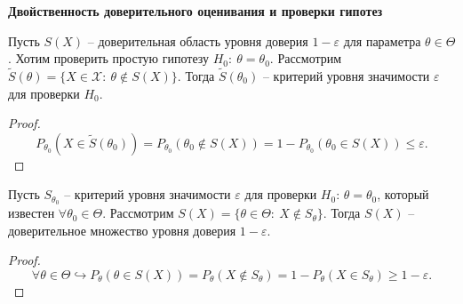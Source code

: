 \textbf{Двойственность доверительного оценивания и проверки гипотез}


\begin{proposition}
    Пусть $\displaystyle S( X)$ -- доверительная область уровня доверия $\displaystyle 1-\varepsilon $ для параметра $\displaystyle \theta \in \Theta $. Хотим проверить простую гипотезу $\displaystyle H_{0} :\ \theta =\theta _{0}$. Рассмотрим $\displaystyle \tilde{S}( \theta ) =\{X\in \mathcal{X} :\ \theta \notin S( X)\}$. Тогда $\displaystyle \tilde{S}( \theta _{0})$ -- критерий уровня значимости $\displaystyle \varepsilon $ для проверки $\displaystyle H_{0}$.
\end{proposition}
\begin{proof}
    \begin{equation*}
        P_{\theta _{0}}\left( X\in \tilde{S}( \theta _{0})\right) =P_{\theta _{0}}( \theta _{0} \notin S( X)) =1-P_{\theta _{0}}( \theta _{0} \in S( X)) \leqslant \varepsilon .
    \end{equation*}
\end{proof}
\begin{proposition}
    Пусть $\displaystyle S_{\theta _{0}}$ -- критерий уровня значимости $\displaystyle \varepsilon $ для проверки $\displaystyle H_{0} :\, \theta =\theta _{0}$, который известен $\forall \theta_0 \in \Theta$. Рассмотрим $\displaystyle S( X) =\{\theta \in \Theta :\ X\notin S_{\theta }\}$. Тогда $\displaystyle S( X)$ -- доверительное множество уровня доверия $\displaystyle 1-\varepsilon $.
\end{proposition}
\begin{proof}
    \begin{equation*}
        \forall \theta \in \Theta \hookrightarrow P_{\theta }( \theta \in S( X)) =P_{\theta }( X\notin S_{\theta }) =1-P_{\theta }( X\in S_{\theta }) \geqslant 1-\varepsilon .
    \end{equation*}
\end{proof}